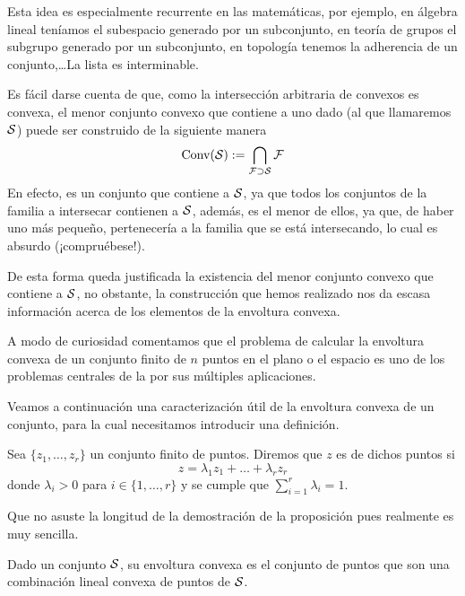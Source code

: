 Esta idea es especialmente recurrente en las matemáticas, por ejemplo, en álgebra lineal teníamos el subespacio generado por un subconjunto, en teoría de grupos el subgrupo generado por un subconjunto, en topología tenemos la adherencia de un conjunto,\dots La lista es interminable.
\begin{obs}[Justificación]
	Es fácil darse cuenta de que, como la intersección arbitraria de convexos es convexa, el menor conjunto convexo que contiene a uno dado (al que llamaremos $\mathcal{S}$) puede ser construido de la siguiente manera
	\begin{equation*}
	\text{Conv}(\mathcal{S}):=\bigcap_{\mathcal{F}\supset \mathcal{S}}\mathcal{F}
	\end{equation*}
	En efecto, es un conjunto que contiene a $\mathcal{S}$, ya que todos los conjuntos de la familia a intersecar contienen a $\mathcal{S}$, además, es el menor de ellos, ya que, de haber uno más pequeño, pertenecería a la familia que se está intersecando, lo cual es absurdo (¡compruébese!).
	
	De esta forma queda justificada la existencia del menor conjunto convexo que contiene a $\mathcal{S}$, no obstante, la construcción que hemos realizado nos da escasa información acerca de los elementos de la envoltura convexa.
\end{obs}
\begin{obs}[Curiosidad]
	A modo de curiosidad comentamos que el problema de calcular la envoltura convexa de un conjunto finito de $n$ puntos en el plano o el espacio es uno de los problemas centrales de la  por sus múltiples aplicaciones.
\end{obs}
Veamos a continuación una caracterización útil de la envoltura convexa de un conjunto, para la cual necesitamos introducir una definición.
\begin{defi}
	Sea $\{z_1,\dots,z_r\}$ un conjunto finito de puntos. Diremos que $z$ es  de dichos puntos si
	\begin{equation*}
		z=\lambda_1 z_1+\dots+\lambda_r z_r
	\end{equation*}
	donde $\lambda_i>0$ para $i\in\{1,\dots,r\}$ y se cumple que $\sum_{i=1}^{r}\lambda_i=1$.
\end{defi}
Que no asuste la longitud de la demostración de la proposición pues realmente es muy sencilla.
\begin{prop}[Caracterización]
	Dado un conjunto $\mathcal{S}$, su envoltura convexa es el conjunto de puntos que son una combinación lineal convexa de puntos de $\mathcal{S}$.
\end{prop}
